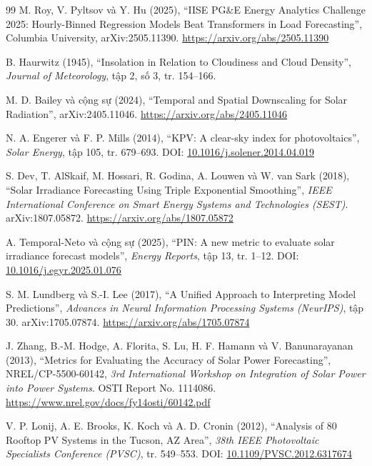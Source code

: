 \documentclass[12pt, a4paper]{report}
\begin{document}
\begin{thebibliography}{99}
M. Roy, V. Pyltsov và Y. Hu (2025),
``IISE PG\&E Energy Analytics Challenge 2025: Hourly-Binned Regression Models Beat Transformers in Load Forecasting'',
Columbia University, arXiv:2505.11390.
\url{https://arxiv.org/abs/2505.11390}

B. Haurwitz (1945),
``Insolation in Relation to Cloudiness and Cloud Density'',
\textit{Journal of Meteorology}, tập 2, số 3, tr. 154--166.

M. D. Bailey và cộng sự (2024),
``Temporal and Spatial Downscaling for Solar Radiation'',
arXiv:2405.11046. \url{https://arxiv.org/abs/2405.11046}

N. A. Engerer và F. P. Mills (2014),
``KPV: A clear-sky index for photovoltaics'',
\textit{Solar Energy}, tập 105, tr. 679--693.
DOI: \href{https://doi.org/10.1016/j.solener.2014.04.019}{10.1016/j.solener.2014.04.019}

S. Dev, T. AlSkaif, M. Hossari, R. Godina, A. Louwen và W. van Sark (2018),
``Solar Irradiance Forecasting Using Triple Exponential Smoothing'',
\textit{IEEE International Conference on Smart Energy Systems and Technologies (SEST)}.
arXiv:1807.05872. \url{https://arxiv.org/abs/1807.05872}

A. Temporal-Neto và cộng sự (2025),
``PIN: A new metric to evaluate solar irradiance forecast models'',
\textit{Energy Reports}, tập 13, tr. 1--12.
DOI: \href{https://doi.org/10.1016/j.egyr.2025.01.076}{10.1016/j.egyr.2025.01.076}

S. M. Lundberg và S.-I. Lee (2017),
``A Unified Approach to Interpreting Model Predictions'',
\textit{Advances in Neural Information Processing Systems (NeurIPS)}, tập 30.
arXiv:1705.07874. \url{https://arxiv.org/abs/1705.07874}

J. Zhang, B.-M. Hodge, A. Florita, S. Lu, H. F. Hamann và V. Banunarayanan (2013),
``Metrics for Evaluating the Accuracy of Solar Power Forecasting'',
NREL/CP-5500-60142, \textit{3rd International Workshop on Integration of Solar Power into Power Systems}. OSTI Report No. 1114086.
\url{https://www.nrel.gov/docs/fy14osti/60142.pdf}

V. P. Lonij, A. E. Brooks, K. Koch và A. D. Cronin (2012),
``Analysis of 80 Rooftop PV Systems in the Tucson, AZ Area'',
\textit{38th IEEE Photovoltaic Specialists Conference (PVSC)}, tr. 549--553.
DOI: \href{https://doi.org/10.1109/PVSC.2012.6317674}{10.1109/PVSC.2012.6317674}


\end{thebibliography}
\end{document}
